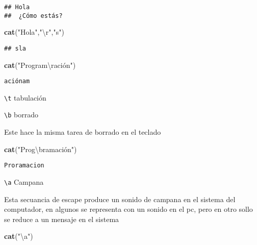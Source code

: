 \documentclass[]{article}
\newenvironment{Shaded}{\begin{snugshade}}{\end{snugshade}}
\newcommand{\KeywordTok}[1]{\textcolor[rgb]{0.13,0.29,0.53}{\textbf{#1}}}
\newcommand{\CharTok}[1]{\textcolor[rgb]{0.31,0.60,0.02}{#1}}
\newcommand{\StringTok}[1]{\textcolor[rgb]{0.31,0.60,0.02}{#1}}
\newcommand{\NormalTok}[1]{#1}
\begin{document}
\begin{verbatim}
## Hola 
##  ¿Cómo estás?
\end{verbatim}

\begin{Shaded}
\begin{Highlighting}[]
\KeywordTok{cat}\NormalTok{(}\StringTok{"Hola"}\NormalTok{,}\StringTok{"}\CharTok{\textbackslash{}r}\StringTok{"}\NormalTok{,}\StringTok{"s"}\NormalTok{)}
\end{Highlighting}
\end{Shaded}

\begin{verbatim}
## sla
\end{verbatim}

\begin{Shaded}
\begin{Highlighting}[]
\KeywordTok{cat}\NormalTok{(}\StringTok{"Program}\CharTok{\textbackslash{}r}\StringTok{ación")}
\end{Highlighting}
\end{Shaded}

\begin{verbatim}
aciónam
\end{verbatim}

\texttt{\textbackslash{}t} tabulación

\texttt{\textbackslash{}b} borrado

Este hace la misma tarea de borrado en el teclado

\begin{Shaded}
\begin{Highlighting}[]
\KeywordTok{cat}\NormalTok{(}\StringTok{"Prog}\CharTok{\textbackslash{}b}\StringTok{ramación")}
\end{Highlighting}
\end{Shaded}

\begin{verbatim}
Proramacion
\end{verbatim}

\texttt{\textbackslash{}a} Campana

Esta secuancia de escape produce un sonido de campana en el sistema del
computador, en algunos se representa con un sonido en el pc, pero en
otro sollo se reduce a un mensaje en el sistema

\begin{Shaded}
\begin{Highlighting}[]
\KeywordTok{cat}\NormalTok{(}\StringTok{"}\CharTok{\textbackslash{}a}\StringTok{"}\NormalTok{)}
\end{Highlighting}
\end{Shaded}
\end{document}
